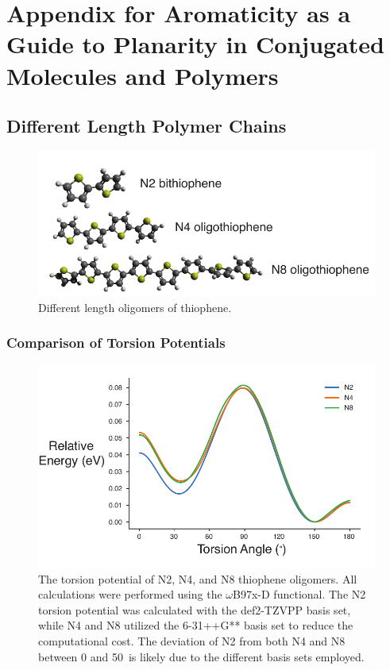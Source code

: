 \chapter{Appendix for Aromaticity as a Guide to Planarity in Conjugated Molecules and Polymers}

\section{Different Length Polymer Chains}\label{sec:aroma_diff_len_poly}
\begin{figure}[hbt!]
    \centering
    \includegraphics{figures/append_aroma/p_chains_graphic_copy.pdf}
    \caption[Different Length Thiophene Oligomers]{Different length oligomers of thiophene.}
    \label{fig:p_chains}
\end{figure}

\clearpage

\subsection{Comparison of Torsion Potentials}
\begin{figure}[hbt!]
    \centering
    \includegraphics{figures/append_aroma/p_tor_compare_copy.pdf}
    \caption[Torsion Potential of Different Length Thiophene Oligomers]{The torsion potential of N2, N4, and N8 thiophene oligomers. All calculations were performed using the $\omega$B97x-D functional. The N2 torsion potential was calculated with the def2-TZVPP basis set, while N4 and N8 utilized the 6-31++G** \cite{Hehre1972} basis set to reduce the computational cost. The deviation of N2 from both N4 and N8 between 0 and 50\textdegree \ is likely due to the different basis sets employed.}
    \label{fig:p_tor_compare}
\end{figure}

